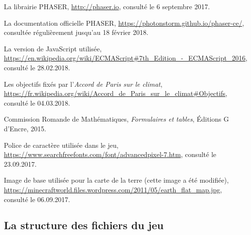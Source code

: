 \documentclass{article}
\begin{document}
        \newpage
        \begin{thebibliography}{9}

  			La librairie PHASER,
  			\url{http://phaser.io},
  			consulté le 6 septembre 2017.
  			
  			La documentation officielle PHASER,
  			\url{https://photonstorm.github.io/phaser-ce/},
  			consultée régulièrement jusqu'au 18 février 2018.
  			
  			La version de JavaScript utilisée,
  			\url{https://en.wikipedia.org/wiki/ECMAScript#7th_Edition_-_ECMAScript_2016},
  			consulté le 28.02.2018.
  			
  			Les objectifs fixés par l'\textit{Accord de Paris sur le climat},
  			\url{https://fr.wikipedia.org/wiki/Accord_de_Paris_sur_le_climat#Objectifs},
  			consulté le 04.03.2018.
  			
  			Commission Romande de Mathématiques, 
  			\textit{Formulaires et tables},
  			Éditions G d'Encre,
  			2015.
  			
  			Police de caractère utilisée dans le jeu,
  			\url{https://www.searchfreefonts.com/font/advancedpixel-7.htm},
  			consulté le 23.09.2017.
  			
  			Image de base utilisée pour la carte de la terre (cette image a été modifiée),
  			\url{https://minecraftworld.files.wordpress.com/2011/05/earth_flat_map.jpg},
  			consulté le 06.09.2017.
 			
		\end{thebibliography}
		
		\begin{appendices}
			\section{La structure des fichiers du jeu} \label{structure}
		\end{appendices}
\end{document}
